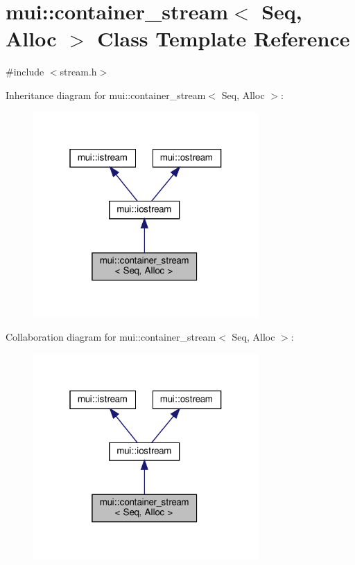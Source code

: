 \hypertarget{classmui_1_1container__stream}{}\section{mui\+:\+:container\+\_\+stream$<$ Seq, Alloc $>$ Class Template Reference}
\label{classmui_1_1container__stream}


{\ttfamily \#include $<$stream.\+h$>$}



Inheritance diagram for mui\+:\+:container\+\_\+stream$<$ Seq, Alloc $>$\+:
\nopagebreak
\begin{figure}[H]
\begin{center}
\leavevmode
\includegraphics[width=244pt]{classmui_1_1container__stream__inherit__graph}
\end{center}
\end{figure}


Collaboration diagram for mui\+:\+:container\+\_\+stream$<$ Seq, Alloc $>$\+:
\nopagebreak
\begin{figure}[H]
\begin{center}
\leavevmode
\includegraphics[width=244pt]{classmui_1_1container__stream__coll__graph}
\end{center}
\end{figure}
